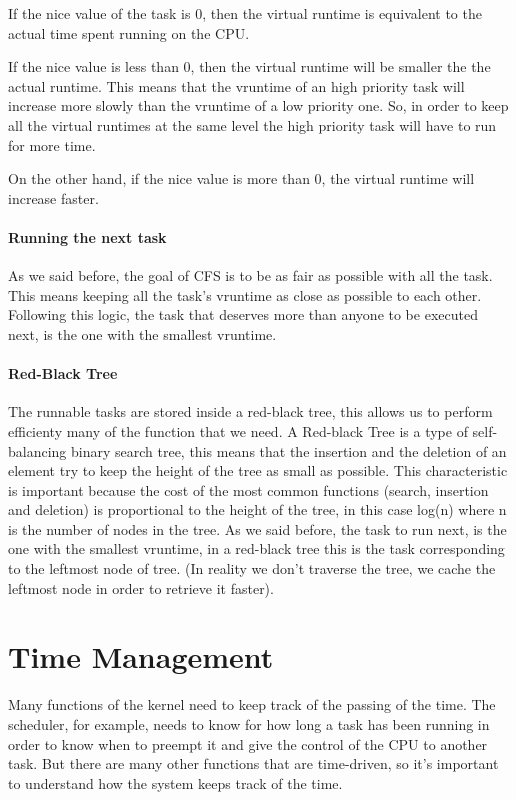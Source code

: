 \documentclass[10pt]{book}
\begin{document}
If the nice value of the task is 0, then the virtual runtime is equivalent to the actual time spent running on the CPU.

If the nice value is less than 0, then the virtual runtime will be smaller the the actual runtime. This means that the vruntime of an high priority task will increase more slowly than the vruntime of a low priority one. So, in order to keep all the virtual runtimes at the same level the high priority task will have to run for more time.

On the other hand, if the nice value is more than 0, the virtual runtime will increase faster.

\paragraph{Running the next task}

As we said before, the goal of CFS is to be as fair as possible with all the task. This means keeping all the task's vruntime as close as possible to each other. Following this logic, the task that deserves more than anyone to be executed next, is the one with the smallest vruntime.

\paragraph{Red-Black Tree}
The runnable tasks are stored inside a red-black tree, this allows us to perform efficienty many of the function that we need.
A Red-black Tree is a type of self-balancing binary search tree, this means that the insertion and the deletion of an element try to keep the height of the tree as small as possible. This characteristic is important because the cost of the most common functions (search, insertion and deletion) is proportional to the height of the tree, in this case log(n) where n is the number of nodes in the tree.
As we said before, the task to run next, is the one with the smallest vruntime, in a red-black tree this is the task corresponding to the leftmost node of tree. (In reality we don't traverse the tree, we cache the leftmost node in order to retrieve it faster).

\section{Time Management}%
Many functions of the kernel need to keep track of the passing of the time. The scheduler, for example, needs to know for how long a task has been running in order to know when to preempt it and give the control of the CPU to another task. But there are many other functions that are time-driven, so it's important to understand how the system keeps track of the time.
\end{document}
